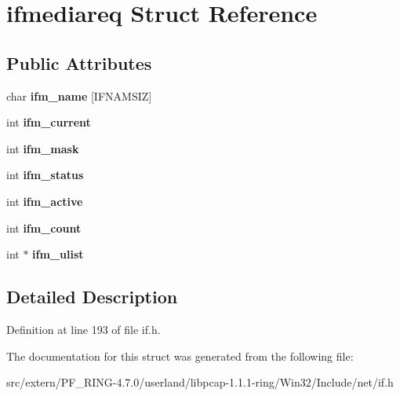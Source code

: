 \hypertarget{structifmediareq}{
\section{ifmediareq Struct Reference}
\label{structifmediareq}
}
\subsection*{Public Attributes}
\begin{DoxyCompactItemize}
\item 
\hypertarget{structifmediareq_ad914c7400107674fc44c012d65421ad6}{
char {\bfseries ifm\_\-name} \mbox{[}IFNAMSIZ\mbox{]}}
\label{structifmediareq_ad914c7400107674fc44c012d65421ad6}

\item 
\hypertarget{structifmediareq_a8528485b798969c51a42389ee46d1b39}{
int {\bfseries ifm\_\-current}}
\label{structifmediareq_a8528485b798969c51a42389ee46d1b39}

\item 
\hypertarget{structifmediareq_a6e33e593672178592f4e490cf9a2999a}{
int {\bfseries ifm\_\-mask}}
\label{structifmediareq_a6e33e593672178592f4e490cf9a2999a}

\item 
\hypertarget{structifmediareq_aaeb945b32eac1151472da2724cd00989}{
int {\bfseries ifm\_\-status}}
\label{structifmediareq_aaeb945b32eac1151472da2724cd00989}

\item 
\hypertarget{structifmediareq_a122c72f1595b656fc13a2985ddd81760}{
int {\bfseries ifm\_\-active}}
\label{structifmediareq_a122c72f1595b656fc13a2985ddd81760}

\item 
\hypertarget{structifmediareq_ab0a8d533b0ae76ecc7f9c9ac8e6db368}{
int {\bfseries ifm\_\-count}}
\label{structifmediareq_ab0a8d533b0ae76ecc7f9c9ac8e6db368}

\item 
\hypertarget{structifmediareq_a21ef75a1b0e728345f9977a7e0e59782}{
int $\ast$ {\bfseries ifm\_\-ulist}}
\label{structifmediareq_a21ef75a1b0e728345f9977a7e0e59782}

\end{DoxyCompactItemize}


\subsection{Detailed Description}


Definition at line 193 of file if.h.



The documentation for this struct was generated from the following file:\begin{DoxyCompactItemize}
\item 
src/extern/PF\_\-RING-\/4.7.0/userland/libpcap-\/1.1.1-\/ring/Win32/Include/net/if.h\end{DoxyCompactItemize}
